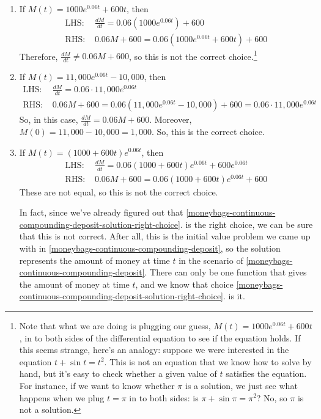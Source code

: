 \documentclass[main]{subfiles}
\begin{document}
\begin{enumerate}
\begin{solution}
    \begin{enumerate}[label=\roman*.]
    \item If $M(t) = 1000 e^{0.06 t} + 600 t$, then
      \begin{align*}
        \text{LHS: } &\frac{dM}{dt} = 0.06 \left( 1000 e^{0.06 t} \right) + 600 \\
        \text{RHS: }&0.06 M + 600 = 0.06 \left( 1000 e^{0.06 t} + 600 t \right) + 600
      \end{align*}
      Therefore, $\frac{dM}{dt} \neq 0.06 M + 600$, so this is not the
      correct choice.\footnote{Note that what we are doing is plugging our
        guess, $M(t) = 1000 e^{0.06 t} + 600 t$, in to both sides of the
        differential equation to see if the equation holds.  If this seems
        strange, here's an analogy: suppose we were interested in the
        equation $t + \sin t = t^2$.  This is not an equation that we know
        how to solve by hand, but it's easy to check whether a given value
        of $t$ satisfies the equation.  For instance, if we want to know
        whether $\pi$ is a solution, we just see what happens when we plug
        $t = \pi$ in to both sides: is $\pi + \sin \pi = \pi^2$?  No, so
        $\pi$ is not a solution.}

    \item If $M(t) = 11,000 e^{0.06 t} - 10,000$, then
      \begin{align*}
        \text{LHS: }&\frac{dM}{dt} = 0.06 \cdot 11,000 e^{0.06 t} \\
        \text{RHS: }&0.06 M + 600  = 0.06 \left( 11,000 e^{0.06 t} - 10,000 \right) +
        600 = 0.06 \cdot 11,000 e^{0.06 t}
      \end{align*}
      So, in this case, $\frac{dM}{dt} = 0.06 M + 600$.  Moreover, $M(0) =
      11,000 - 10,000 = 1,000$.  So, this is the correct choice.

    \item If $M(t) = (1000 + 600 t) e^{0.06 t}$, then
      \begin{align*}
        \text{LHS: }&\frac{dM}{dt} = 0.06 (1000 + 600 t) e^{0.06 t} + 600 e^{0.06 t} \\
        \text{RHS: }&0.06 M + 600 = 0.06 (1000 + 600 t) e^{0.06 t} + 600
      \end{align*}
      These are not equal, so this is not the correct choice.

      In fact, since we've already figured out that
      \ref{moneybags-continuous-compounding-deposit-solution-right-choice}.
      is the right choice, we can be sure that this is not correct.  After
      all, this is the initial value problem we came up with in
      \ref{moneybags-continuous-compounding-deposit}, so the solution
      represents the amount of money at time $t$ in the scenario of
      \ref{moneybags-continuous-compounding-deposit}.  There can only be
      one function that gives the amount of money at time $t$, and we know
      that choice
      \ref{moneybags-continuous-compounding-deposit-solution-right-choice}.
      is it. 
    \end{enumerate}
  \end{solution}
  


\end{enumerate}
\end{document}
